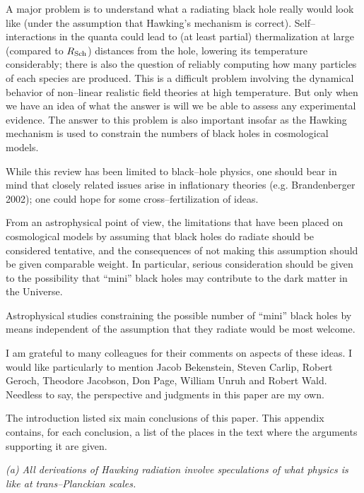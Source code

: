 A major problem is to understand what a radiating black hole really would look
like (under the assumption that Hawking's mechanism is correct). 
Self--interactions in the quanta could lead to (at least partial)
thermalization at large (compared to $R_{\rm Sch}$) distances from the hole,
lowering its temperature considerably; there is also the question of reliably
computing how many particles of each species are produced. This is a difficult
problem involving the dynamical behavior of non--linear realistic field
theories at high temperature.  But only when we have an idea of what the answer
is will we be able to assess any experimental evidence.  The answer to this
problem is also important insofar as the Hawking mechanism is used to constrain
the numbers of black holes in cosmological models.  

While this review has been limited to black--hole physics, one should bear in
mind that closely related issues arise in inflationary theories (e.g.
Brandenberger 2002); one could hope for some cross--fertilization of ideas.

From an astrophysical point of view, the limitations that have been placed on
cosmological models by assuming that black holes do radiate should be
considered tentative, and the consequences of not making this assumption should
be given comparable weight.  In particular, serious consideration should be
given to the possibility that ``mini'' black holes may contribute to the dark
matter in the Universe.

Astrophysical studies constraining the possible number of ``mini'' black holes
by means independent of the assumption that they radiate would be most welcome.

\ack

I am grateful to many colleagues for their comments on aspects of these ideas. 
I would like particularly to mention Jacob Bekenstein,
Steven Carlip, Robert Geroch, Theodore Jacobson, Don Page, William Unruh and
Robert Wald.  Needless to say, the perspective and judgments in this
paper are my own.


The introduction listed six main conclusions of this paper.  This
appendix contains, for each conclusion, a list of the places in the
text where the arguments supporting it are given.

\smallskip
\it (a) All derivations of Hawking radiation involve
speculations of what physics is like at trans--Planckian scales.  \rm

